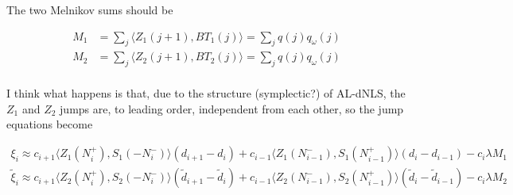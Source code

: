 \documentclass[12pt]{article}
\begin{document}
The two Melnikov sums should be

\begin{align*}
M_1 &= \sum_j \langle Z_1(j+1), B T_1(j) \rangle = \sum_j q(j) q_\omega(j) \\
M_2 &= \sum_j \langle Z_2(j+1), B T_2(j) \rangle = \sum_j q(j) q_\omega(j) \\
\end{align*}

I think what happens is that, due to the structure (symplectic?) of AL-dNLS, the $Z_1$ and $Z_2$ jumps are, to leading order, independent from each other, so the jump equations become

\begin{align*}
\xi_i \approx c_{i+1} \langle Z_1(N_i^+), S_1(-N_i^-) \rangle (d_{i+1} - d_i)
+ c_{i-1} \langle Z_1(N_{i-1}^-), S_1(N_{i-1}^+) \rangle (d_i - d_{i-1}) - c_i \lambda M_1 \\
\tilde{\xi}_i \approx c_{i+1} \langle Z_2(N_i^+), S_2(-N_i^-) \rangle (\tilde{d}_{i+1} - \tilde{d}_i)
+ c_{i-1} \langle Z_2(N_{i-1}^-), S_2(N_{i-1}^+) \rangle (\tilde{d}_i - \tilde{d}_{i-1}) - c_i \lambda M_2
\end{align*}
\end{document}
